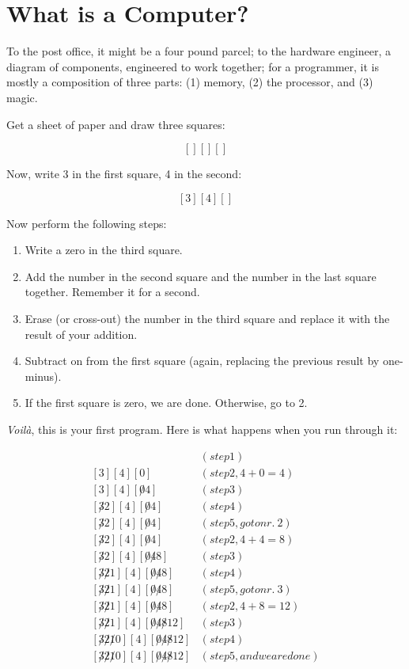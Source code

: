 \chapter{What is a Computer?}

To the post office, it might be a four pound parcel; to the hardware engineer,
a diagram of components, engineered to work together; for a programmer, it is
mostly a composition of three parts: (1) memory, (2) the processor, and (3)
magic.

Get a sheet of paper and draw three squares:

\[
[ ] [ ] [ ]
\]

Now, write 3 in the first square, 4 in the second:

\[
[ 3 ] [ 4 ] [  ]
\]

Now perform the following steps:

\begin{enumerate}
\item Write a zero in the third square.
\item Add the number in the second square and the number in the last square
together. Remember it for a second.
\item Erase (or cross-out) the number in the third square and replace it with
the result of your addition.
\item Subtract on from the first square (again, replacing the previous result
by one-minus).
\item If the first square is zero, we are done. Otherwise, go to 2.
\end{enumerate}

\emph{Voilà}, this is your first program. Here is what happens when you run through it:

\begin{align*}
[ 3 ] [ 4 ] [ 0 ] & (step 1)\\
[ 3 ] [ 4 ] [ 0 ] & (step 2, 4+0=4)\\
[ 3 ] [ 4 ] [ \not0 4 ] & (step 3)\\
[ \not3 2 ] [ 4 ] [ \not0 4 ] & (step 4)\\
[ \not3 2 ] [ 4 ] [ \not0 4 ] & (step 5, go to nr.\ 2)\\
[ \not3 2 ] [ 4 ] [ \not0 4 ] & (step 2, 4+4=8)\\
[ \not3 2 ] [ 4 ] [ \not0 \not4 8 ] & (step 3)\\
[ \not3 \not2 1 ] [ 4 ] [ \not0 \not4 8 ] & (step 4)\\
[ \not3 \not2 1 ] [ 4 ] [ \not0 \not4 8 ] & (step 5, go to nr.\ 3)\\
[ \not3 \not2 1 ] [ 4 ] [ \not0 \not4 8 ] & (step 2, 4+8=12)\\
[ \not3 \not2 1 ] [ 4 ] [ \not0 \not4 \not8 12 ] & (step 3)\\
[ \not3 \not2 \not1 0 ] [ 4 ] [ \not0 \not4 \not8 12 ] & (step 4)\\
[ \not3 \not2 \not1 0 ] [ 4 ] [ \not0 \not4 \not8 12 ] & (step 5, and we are done)
\end{align*}

